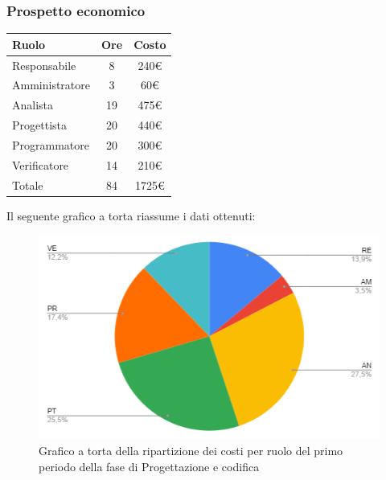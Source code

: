 {{{{{{{{\subsubsection{Prospetto economico}\label{PreventivoFaseDiProgettazioneDiDettaglioECodificaProspettoEconomicoPeriodo1}
\quad
\def\tabularxcolumn#1{m{#1}}
{
	\begin{center}
		\renewcommand{\arraystretch}{1.4}
		\begin{tabularx}{7cm}{|X|c|c|}
			\hline
			\rowcolor{airforceblue}
			\textbf{Ruolo} & \textbf{Ore} & \textbf{Costo}\\
			\hline
			Responsabile & 8 & 240\euro\\
			\hline
			Amministratore & 3 & 60\euro\\
			\hline
			Analista & 19 & 475\euro\\
			\hline
			Progettista & 20 & 440\euro\\
			\hline
			Programmatore & 20 & 300\euro\\
			\hline
			Verificatore & 14 & 210\euro\\
			\hline
			Totale & 84 & 1725\euro\\
			\hline
		\end{tabularx}
	\end{center}

Il seguente grafico a torta riassume i dati ottenuti:
\begin{figure}[!ht]
	\begin{center}
		\includegraphics[width=0.8\linewidth]{../immagini/pdp/torta_progettazione_dettaglio_periodo1.png}
		\caption{Grafico a torta della ripartizione dei costi per ruolo del primo periodo della fase di Progettazione e codifica}
	\end{center}
\end{figure}

}}}}}}}}}
